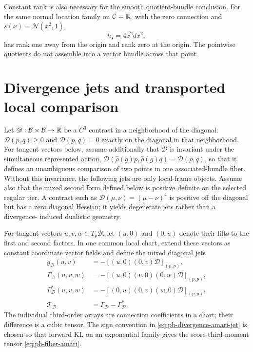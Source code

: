 Constant rank is also necessary for the smooth quotient-bundle conclusion.
For the same normal location family on $\mathcal C=\mathbb R$, with the zero
connection and $s(x)=\mathcal N(x^2,1)$,
\begin{equation}
h_s=4x^2dx^2,
\label{eq:pb-rank-jump-example}
\end{equation}
has rank one away from the origin and rank zero at the origin.  The pointwise
quotients do not assemble into a vector bundle across that point.

\section{Divergence jets and transported local comparison}
\label{sec:pb-divergence-jets}

Let $\mathscr D:\mathcal B\times\mathcal B\to\mathbb R$ be a $C^3$ contrast in a
neighborhood of the diagonal: $\mathscr D(p,q)\geq0$ and
$\mathscr D(p,q)=0$ exactly on the diagonal in that neighborhood.  For tangent
vectors below, assume additionally that $\mathscr D$ is invariant under the
simultaneous represented action,
$\mathscr D(\widehat\rho(g)p,\widehat\rho(g)q)=\mathscr D(p,q)$, so that it
defines an unambiguous comparison of two points in one associated-bundle
fiber.  Without this invariance, the following jets are only local-frame
objects.  Assume also that the mixed second form defined below is positive
definite on the selected regular tier.  A contrast such as
$\mathscr D(\mu,\nu)=(\mu-\nu)^4$ is positive off the diagonal but has a
zero diagonal Hessian; it yields degenerate jets rather than a divergence-
induced dualistic geometry. 

For tangent
vectors $u,v,w\in T_p\mathcal B$, let $(u,0)$ and $(0,u)$ denote their lifts
to the first and second factors.  In one common local chart, extend these
vectors as constant coordinate vector fields and define the mixed diagonal
jets
\begin{align}
g_{\mathscr D}(u,v)
&=-[(u,0)(0,v)\mathscr D]_{(p,p)},
\label{eq:pb-divergence-metric-jet}\\
\Gamma_{\mathscr D}(u,v,w)
&=-[(u,0)(v,0)(0,w)\mathscr D]_{(p,p)},
\label{eq:pb-divergence-first-connection-jet}\\
\Gamma_{\mathscr D}^*(u,v,w)
&=-[(0,u)(0,v)(w,0)\mathscr D]_{(p,p)},
\label{eq:pb-divergence-dual-connection-jet}\\
\mathcal T_{\mathscr D}
&=\Gamma_{\mathscr D}-\Gamma_{\mathscr D}^*.
\label{eq:pb-divergence-amari-jet}
\end{align}
The individual third-order arrays are connection coefficients in a chart;
their difference is a cubic tensor.  The sign convention in
\eqref{eq:pb-divergence-amari-jet} is chosen so that forward KL on an
exponential family gives the score-third-moment tensor
\eqref{eq:pb-fiber-amari}.  

